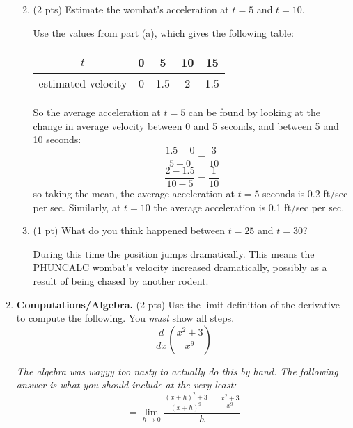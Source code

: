 \documentclass[11pt,letterpaper]{article}
\begin{document}
\begin{enumerate}
\begin{enumerate}
\vspace{1pc}
\item (2 pts)
Estimate the wombat's acceleration at $t=5$ and $t=10$.

Use the values from part (a), which gives the following table:
\begin{center}
\begin{tabular}{c|cccc}
$t$ & 0 & 5 & 10 & 15 \\
\hline
estimated velocity & 0 & 1.5 & 2 & 1.5 
\end{tabular}
\end{center}
So the average acceleration at $t=5$ can be found by looking at the change in average velocity between 0 and 5 seconds, and between 5 and 10 seconds:
\[\frac{1.5-0}{5-0}=\frac{3}{10}\]
\[\frac{2-1.5}{10-5}=\frac{1}{10}\]
so taking the mean, the average acceleration at $t=5$ seconds is 0.2 ft/sec per sec.  Similarly, at $t=10$ the average acceleration is 0.1 ft/sec per sec.

\vspace{1pc}
\item (1 pt)
What do you think happened between $t=25$ and $t=30$?

During this time the position jumps dramatically.  This means the PHUNCALC wombat's velocity increased dramatically, possibly as a result of being chased by another rodent.
\end{enumerate}

\vspace{1pc}
\item \textbf{Computations/Algebra.} (2 pts) Use the limit definition of the derivative to compute the following.  You \emph{must} show all steps.
\[\frac{d}{dx}\left(\frac{x^2+3}{x^9}\right)\]

\textit{The algebra was wayyy too nasty to actually do this by hand.  The following answer is what you should include at the very least:}
\[=\lim_{h\rightarrow 0}\frac{\frac{(x+h)^2+3}{(x+h)^9}-\frac{x^2+3}{x^9}}{h}\]

\end{enumerate}
\end{document}
